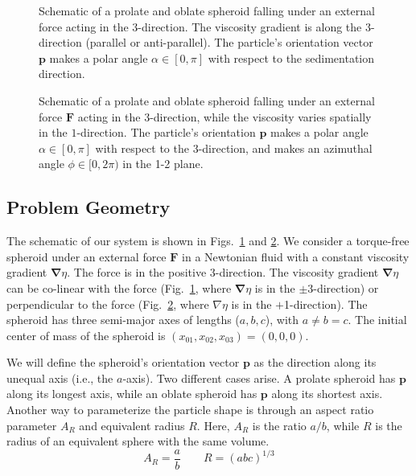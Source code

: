 \documentclass{jfm}
\begin{document}
\begin{figure}
\centering
{}
\caption{Schematic of a prolate and oblate spheroid falling under an external force acting in the 3-direction.  The viscosity gradient is along the 3-direction (parallel or anti-parallel).  The particle’s orientation vector $\boldsymbol{p}$ makes a polar angle $\alpha \in [0,\pi]$ with respect to the sedimentation direction. }
\label{fig:Schematic_Parallel}
\end{figure}


\begin{figure}
\centering
{}
\caption{Schematic of a prolate and oblate spheroid falling under an external force $\boldsymbol{F}$ acting in the $3$-direction, while the viscosity varies spatially in the $1$-direction. The particle’s orientation $\boldsymbol{p}$ makes a polar angle $\alpha \in [0,\pi]$ with respect to the 3-direction, and makes an azimuthal angle $\phi \in [0,2\pi)$ in the 1-2 plane.}
\label{fig:Schematic_Perpendicular}
\end{figure}

\subsection{Problem Geometry}

The schematic of our system is shown in Figs.~\ref{fig:Schematic_Parallel} and \ref{fig:Schematic_Perpendicular}. We consider a torque-free spheroid under an external force $\boldsymbol{F}$ in a Newtonian fluid with a constant viscosity gradient $\boldsymbol{\nabla} \eta$. The force is in the positive 3-direction.  The viscosity gradient $\boldsymbol{\nabla} \eta$ can be co-linear with the force (Fig.~\ref{fig:Schematic_Parallel}, where $\boldsymbol{\nabla} \eta$  is in the $\pm$3-direction) or perpendicular to the force (Fig.~\ref{fig:Schematic_Perpendicular}, where $\nabla \eta$ is in the $+$1-direction). The spheroid has three semi-major axes of lengths ($a, b, c$), with $a\neq b = c$.  The initial center of mass of the spheroid is $(x_{01},x_{02},x_{03})=(0,0,0)$.

We will define the spheroid’s orientation vector $\boldsymbol{p}$ as the direction along its unequal axis (i.e., the $a$-axis).  Two different cases arise. A prolate spheroid has $\boldsymbol{p}$ along its longest axis, while an oblate spheroid has $\boldsymbol{p}$ along its shortest axis. Another way to parameterize the particle shape is through an aspect ratio parameter $A_R$ and equivalent radius $R$. Here, $A_R$ is the ratio $a/b$, while $R$ is the radius of an equivalent sphere with the same volume.
\begin{equation}
\label{eq:aspectratio}
    A_R =\frac{a}{b} \qquad
    R =(abc)^{1/3}   
\end{equation}
\end{document}
